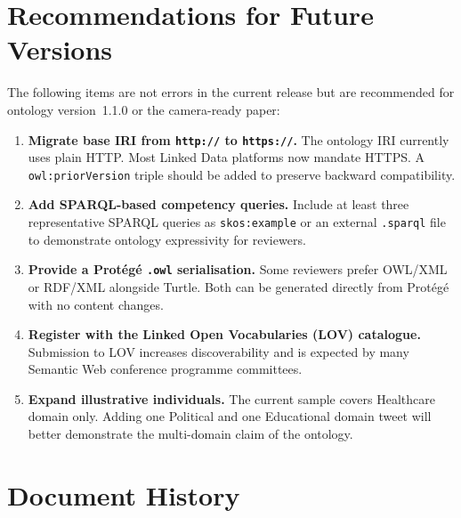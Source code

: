 \documentclass[11pt, a4paper]{article}
\begin{document}
\section{Recommendations for Future Versions}

The following items are not errors in the current release but are
recommended for ontology version~1.1.0 or the camera-ready paper:

\begin{enumerate}[leftmargin=1.4em, itemsep=4pt]
  \item \textbf{Migrate base IRI from \texttt{http://} to \texttt{https://}.}
    The ontology IRI currently uses plain HTTP. Most Linked Data platforms
    now mandate HTTPS. A \texttt{owl:priorVersion} triple should be added
    to preserve backward compatibility.

  \item \textbf{Add SPARQL-based competency queries.}
    Include at least three representative SPARQL queries as
    \texttt{skos:example} or an external \texttt{.sparql} file to demonstrate
    ontology expressivity for reviewers.

  \item \textbf{Provide a Protégé \texttt{.owl} serialisation.}
    Some reviewers prefer OWL/XML or RDF/XML alongside Turtle.
    Both can be generated directly from Protégé with no content changes.

  \item \textbf{Register with the Linked Open Vocabularies (LOV) catalogue.}
    Submission to LOV increases discoverability and is expected by many
    Semantic Web conference programme committees.

  \item \textbf{Expand illustrative individuals.}
    The current sample covers Healthcare domain only. Adding one
    Political and one Educational domain tweet will better demonstrate
    the multi-domain claim of the ontology.
\end{enumerate}

\section*{Document History}
\end{document}
